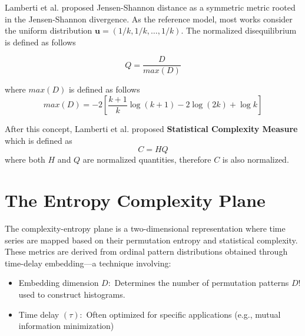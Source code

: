 Lamberti et al. \cite{lamberti2004intensive} proposed Jensen-Shannon distance as a symmetric metric rooted in the Jensen-Shannon divergence. As the reference model, most works consider the uniform distribution $\mathbf{u}=(1/k,1/k, \dots, 1/k)$. The normalized disequilibrium is defined as follows

\begin{equation}
	Q=\dfrac{D}{max{(D)}}
\end{equation}

where $max(D)$ is defined as follows
\begin{equation}
	max(D)=-2 \left[\dfrac{k+1}{k}\log(k+1)-2\log(2k)+\log k\right]
\end{equation}

After this concept, Lamberti et al. \cite{lamberti2004intensive} proposed \textbf{Statistical Complexity Measure} which is defined as 
\begin{equation}
	C=HQ
\end{equation}
where both $H$ and $Q$ are normalized quantities, therefore $C$ is also normalized. 
  
\section{The Entropy Complexity Plane}
The complexity-entropy plane is a two-dimensional representation where time series are mapped based on their permutation entropy and statistical complexity. These metrics are derived from ordinal pattern distributions obtained through time-delay embedding—a technique involving:
\begin{itemize}
	\item Embedding dimension $D:$ Determines the number of permutation patterns $D!$ used to construct histograms.
	\item Time delay $(\tau):$ Often optimized for specific applications (e.g., mutual information minimization)  
\end{itemize} 

